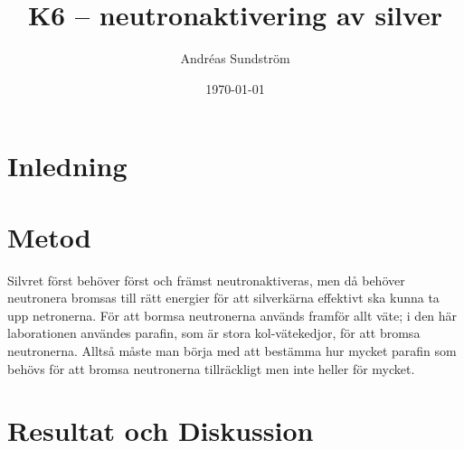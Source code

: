 \documentclass[11pt,a4paper, english, swedish
]{article}
\begin{document}

\title{K6 -- neutronaktivering av silver}
\author{Andréas Sundström}
\date{\today}

\maketitle



\section{Inledning}

\section{Metod}
Silvret först behöver först och främst neutronaktiveras, men då
behöver neutronera bromsas till rätt energier för att silverkärna
effektivt ska kunna ta upp netronerna. För att bormsa neutronerna
används framför allt väte; i den här laborationen användes parafin,
som är stora kol-vätekedjor, för att bromsa neutronerna. Alltså måste
man börja med att bestämma hur mycket parafin som behövs för att
bromsa neutronerna tillräckligt men inte heller för mycket.


\begin{figure}\centering
\resizebox{.5\textwidth}{!}{}
\caption{}
\label{fig:aktivering}
\end{figure}


\section{Resultat och Diskussion}
\end{document}
